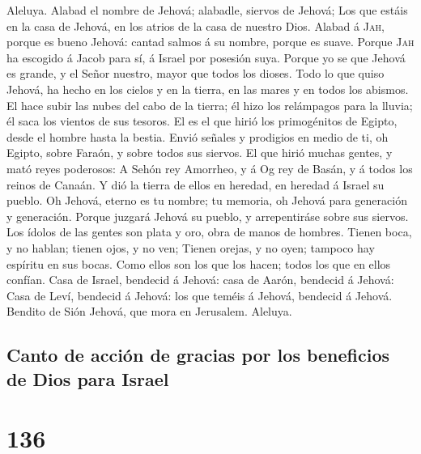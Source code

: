  Aleluya. Alabad el nombre de Jehová; alabadle, siervos de
Jehová;  Los que estáis en la casa de Jehová, en los
atrios de la casa de nuestro Dios.  Alabad á \textsc{Jah},
porque es bueno Jehová: cantad salmos á su nombre, porque es suave.
 Porque \textsc{Jah} ha escogido á Jacob para sí, á Israel
por posesión suya.  Porque yo se que Jehová es grande, y
el Señor nuestro, mayor que todos los dioses.  Todo lo que
quiso Jehová, ha hecho en los cielos y en la tierra, en las mares y en
todos los abismos.  El hace subir las nubes del cabo de la
tierra; él hizo los relámpagos para la lluvia; él saca los vientos de
sus tesoros.  El es el que hirió los primogénitos de
Egipto, desde el hombre hasta la bestia.  Envió señales y
prodigios en medio de ti, oh Egipto, sobre Faraón, y sobre todos sus
siervos.  El que hirió muchas gentes, y mató reyes
poderosos:  A Sehón rey Amorrheo, y á Og rey de Basán, y
á todos los reinos de Canaán.  Y dió la tierra de ellos
en heredad, en heredad á Israel su pueblo.  Oh Jehová,
eterno es tu nombre; tu memoria, oh Jehová para generación y generación.
 Porque juzgará Jehová su pueblo, y arrepentiráse sobre
sus siervos.  Los ídolos de las gentes son plata y oro,
obra de manos de hombres.  Tienen boca, y no hablan;
tienen ojos, y no ven;  Tienen orejas, y no oyen; tampoco
hay espíritu en sus bocas.  Como ellos son los que los
hacen; todos los que en ellos confían.  Casa de Israel,
bendecid á Jehová: casa de Aarón, bendecid á Jehová: 
Casa de Leví, bendecid á Jehová: los que teméis á Jehová, bendecid á
Jehová.  Bendito de Sión Jehová, que mora en Jerusalem.
Aleluya.

\hypertarget{canto-de-acciuxf3n-de-gracias-por-los-beneficios-de-dios-para-israel}{%
\subsection{Canto de acción de gracias por los beneficios de Dios para
Israel}\label{canto-de-acciuxf3n-de-gracias-por-los-beneficios-de-dios-para-israel}}

\hypertarget{section-135}{%
\section{136}\label{section-135}}

